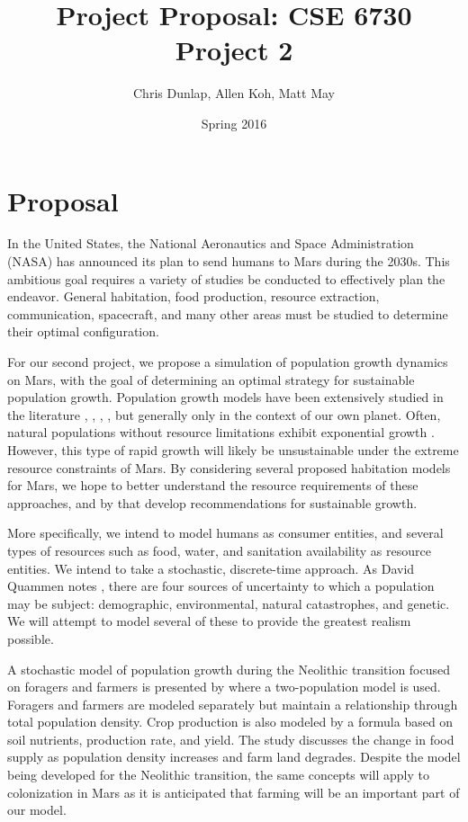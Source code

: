 \documentclass[12pt]{article}
\title{Project Proposal: CSE 6730 Project 2}
\author{Chris Dunlap, Allen Koh, Matt May}
\date{Spring 2016}
\begin{document}
\begin{titlepage}
  \maketitle
  \thispagestyle{empty}
\end{titlepage}

\newpage
  \tableofcontents
  \thispagestyle{empty}
\newpage

\section{Proposal}
\label{sec:proposal}

In the United States, the National Aeronautics and Space Administration (NASA)
has announced its plan to send humans to Mars during the 2030s. This ambitious
goal requires a variety of studies be conducted to effectively plan the
endeavor. General habitation, food production, resource extraction,
communication, spacecraft, and many other areas must be studied to determine
their optimal configuration.

For our second project, we propose a simulation of population growth dynamics on
Mars, with the goal of determining an optimal strategy for sustainable
population growth. Population growth models have been extensively studied in the
literature \cite{clark1967population}, \cite{caswell2001matrix},
\cite{meadows1992beyond}, \cite{boserup1983population},
\cite{ehrlich1971impact} but generally only in the context of our own planet.
Often, natural populations without resource limitations exhibit exponential
growth \cite{audesirk1996biology}. However, this type of rapid growth will
likely be unsustainable under the extreme resource constraints of Mars.
By considering several proposed habitation models for Mars, we hope to better
understand the resource requirements of these approaches, and by that develop
recommendations for sustainable growth.

More specifically, we intend to model humans as consumer entities, and several
types of resources such as food, water, and sanitation availability as resource
entities. We intend to take a stochastic, discrete-time approach. As David
Quammen notes \cite{quammen1996song}, there are four sources of uncertainty to
which a population may be subject: demographic, environmental, natural
catastrophes, and genetic. We will attempt to model several of these to
provide the greatest realism possible.

A stochastic model of population growth	during the Neolithic transition focused on foragers and farmers is presented by \cite{fedotov2008stochastic} where a two-population model is used. Foragers and farmers are modeled separately but maintain a relationship through total population density.  Crop production is also modeled by a formula based on soil nutrients, production rate, and yield.  The study discusses the change in food supply as population density increases and farm land degrades.  Despite the model being developed for the Neolithic transition, the same concepts will apply to colonization in Mars as it is anticipated that farming will be an important part of our model.  	
\end{document}
